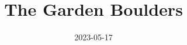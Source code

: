 \documentclass[10pt, twoside]{report}
\begin{document}
\title{The Garden Boulders}
\date{2023-05-17}
\maketitle
\shipout\null

\newcommand\chapterColor{MidnightBlue}

\renewcommand\chapterColor{BrickRed}

\renewcommand\chapterColor{RoyalPurple}

\renewcommand\chapterColor{BurntOrange}

\renewcommand\chapterColor{Aquamarine}

\renewcommand\chapterColor{RubineRed}

\renewcommand\chapterColor{MidnightBlue}

\end{document}
